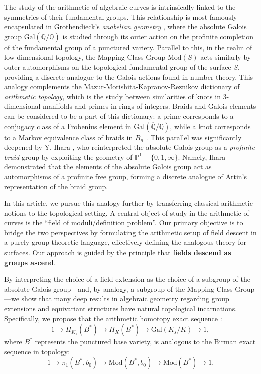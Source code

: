 \documentclass[10pt]{amsart}
\theoremstyle{definition}
\newcommand{\Gal}{{ \mathrm{Gal}}}
\begin{document}
The study of the arithmetic of algebraic curves is intrinsically linked to the symmetries of their fundamental groups. This relationship is most famously encapsulated in Grothendieck's \textit{anabelian geometry} \cite{MR1483107}, where the absolute Galois group $\Gal(\overline{\mathbb{Q}}/\mathbb{Q})$ is studied through its outer action on the profinite completion of the fundamental group of a punctured  variety. Parallel to this, in the realm of low-dimensional topology, the Mapping Class Group $\mathrm{Mod}(S)$ acts similarly by outer automorphisms on the topological fundamental group of the surface $S$, providing a discrete analogue to the Galois actions found in number theory. 
This analogy complements the Mazur-Morishita-Kapranov-Reznikov dictionary \cite{Morishita2011-yw, MR1925911, MazurAlex} of \textit{arithmetic topology}, which is the study between similarities of knots in $3$-dimensional manifolds and primes in rings of integers.
Braids and Galois elements can be considered to be a part of this dictionary: a prime corresponds to a conjugacy class of a Frobenius element in $\Gal(\overline{\mathbb{Q}}/\mathbb{Q})$, while a knot corresponds to a Markov equivalence class of braids in $B_n$ \cite{MR4117575}. This parallel was significantly deepened by Y. Ihara \cite{Ihara1985-it, IharaCruz, MR1159208, MorishitaATIT}, who reinterpreted the absolute Galois group as a \textit{profinite braid} group by exploiting the geometry of $\mathbb{P}^1-\{0,1,\infty\}$. 
Namely, Ihara demonstrated that the elements of the absolute Galois group act as automorphisms of a profinite free group, forming a discrete analogue of Artin's representation of the braid group.


In this article, we pursue this analogy further by transferring classical arithmetic notions to the topological setting. A central object of study in the arithmetic of curves is the ``field of moduli/definition problem''. Our primary objective is to bridge the two perspectives by formulating the arithmetic setup of field descent in a purely group-theoretic language, effectively defining the analogous theory for surfaces. Our approach is guided by the principle that \textbf{fields descend as groups ascend}.

By interpreting the choice of a field extension as the choice of a subgroup of the absolute Galois group—and, by analogy, a subgroup of the Mapping Class Group—we show that many deep results in algebraic geometry regarding group extensions and equivariant structures have natural topological incarnations. Specifically, we propose that the arithmetic homotopy exact sequence \cite{SGA1}:
\begin{equation}\label{intro:1}
1 \to \Pi_{K_s}(B^*) \to \Pi_K(B^*) \to \Gal(K_s/K) \to 1,
\end{equation}
where $B^*$ represents the punctured base variety,
is analogous to the Birman exact sequence \cite{FarbMagalit} in topology:
\begin{equation}\label{intro:2}
    1 \to \pi_1(B^*,b_0) \to \mathrm{Mod}(B^*,b_0) \to \mathrm{Mod}(B^*) \to 1.
\end{equation}
\end{document}

